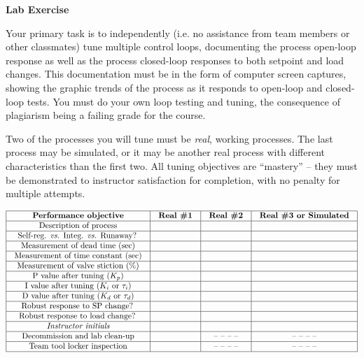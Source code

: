 

\noindent
{\bf Lab Exercise}

\vskip 5pt

Your primary task is to independently (i.e. no assistance from team members or other classmates) tune multiple control loops, documenting the process open-loop response as well as the process closed-loop responses to both setpoint and load changes.  This documentation must be in the form of computer screen captures, showing the graphic trends of the process as it responds to open-loop and closed-loop tests.  You must do your own loop testing and tuning, the consequence of plagiarism being a failing grade for the course.

Two of the processes you will tune must be {\it real}, working processes.  The last process may be simulated, or it may be another real process with different characteristics than the first two.  All tuning objectives are ``mastery'' -- they must be demonstrated to instructor satisfaction for completion, with no penalty for multiple attempts.

\vskip 10pt



$$\vbox{\offinterlineskip
\halign{\strut
\vrule \quad\hfil # \ \hfil & 
\vrule \quad\hfil # \ \hfil & 
\vrule \quad\hfil # \ \hfil & 
\vrule \quad\hfil # \ \hfil \vrule \cr
\noalign{\hrule}
%
{\bf Performance objective} & {\bf Real \#1} & {\bf Real \#2} & {\bf Real \#3 or Simulated} \cr
%
\noalign{\hrule}
%
Description of process &  &  &  \cr
%
\noalign{\hrule}
%
Self-reg. {\it vs.} Integ. {\it vs.} Runaway? &  &  &  \cr
%
\noalign{\hrule}
%
Measurement of dead time (sec) &  &  &  \cr
%
\noalign{\hrule}
%
Measurement of time constant (sec) &  &  &  \cr
%
\noalign{\hrule}
%
Measurement of valve stiction (\%) &  &  &  \cr
%
\noalign{\hrule}
%
P value after tuning ($K_p$) &  &  &  \cr
%
\noalign{\hrule}
%
I value after tuning ($K_i$ or $\tau_i$) &  &  &  \cr
%
\noalign{\hrule}
%
D value after tuning ($K_d$ or $\tau_d$) &  &  &  \cr
%
\noalign{\hrule}
%
Robust response to SP change? &  &  &  \cr
%
\noalign{\hrule}
%
Robust response to load change? &  &  &  \cr
%
\noalign{\hrule}
%
{\it Instructor initials} &  &  &  \cr
%
\noalign{\hrule}
%
Decommission and lab clean-up &  & -- -- -- -- & -- -- -- -- \cr
%
\noalign{\hrule}
%
Team tool locker inspection &  & -- -- -- -- & -- -- -- -- \cr
%
\noalign{\hrule}
} %
}$$ %

